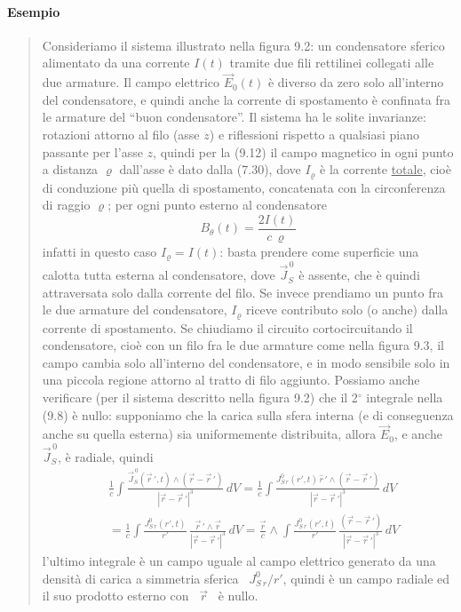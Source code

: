 \paragraph{Esempio}
\begin{quote}
  Consideriamo il sistema illustrato nella figura 9.2: un condensatore sferico
  alimentato da una corrente $I(t)$ tramite due fili rettilinei collegati alle
  due armature. Il campo elettrico $\vec E_0(t)$ \`e diverso da zero solo
  all'interno del condensatore, e quindi anche la corrente di spostamento \`e
  confinata fra le armature del ``buon condensatore''. Il sistema ha le solite
  invarianze: rotazioni attorno al filo (asse $z$) e riflessioni rispetto a
  qualsiasi piano passante per l'asse $z$, quindi per la (9.12) il campo
  magnetico in ogni punto a distanza $\varrho$ dall'asse
  \`e dato dalla (7.30), dove $I_\varrho$ \`e la corrente \underline{totale},
  cio\`e di conduzione pi\`u quella di spostamento, concatenata con la
  circonferenza di raggio $\varrho$; per ogni punto esterno al condensatore
  \begin{equation}
    B_\theta(t)=\frac{2I(t)}{c\,\varrho}
    \tag{9.13}
  \end{equation}
  infatti in questo caso $I_\varrho=I(t)$: basta prendere come superficie una
  calotta tutta esterna al condensatore, dove $\vec J_S^{\,0}$ \`e assente, che
  \`e quindi attraversata solo dalla corrente del filo. Se invece prendiamo un
  punto fra le due armature del condensatore, $I_\varrho$ riceve contributo solo
  (o anche) dalla corrente di spostamento.
  Se chiudiamo il circuito cortocircuitando il condensatore, cio\`e con un filo
  fra le due armature come nella figura 9.3, il campo cambia solo all'interno
  del condensatore, e in modo sensibile solo in una piccola regione attorno al
  tratto di filo aggiunto.
  Possiamo anche verificare (per il sistema descritto nella figura 9.2) che il
  2$^\circ$ integrale nella (9.8) \`e nullo: supponiamo che la carica sulla
  sfera interna (e di conseguenza anche su quella esterna) sia uniformemente
  distribuita, allora $\vec E_0$, e anche $\vec J_S^{\,0}$, \`e radiale, quindi
  \begin{equation}
    \begin{aligned}
      &\frac{1}{c}\int\frac{\vec J_S^{\,0}(\vec r\,',t)\wedge(\vec r-\vec r\,')}
      {|\vec r-\vec r\,'|^3}\,dV
      =\frac{1}{c}\int\frac{J_{S\,r}^0(r',t)\,\hat r\,'\wedge(\vec r-\vec r\,')}
      {|\vec r-\vec r\,'|^3}\,dV\\
      &=\frac{1}{c}\int\frac{J_{S\,r}^0(r',t)}{r'}\,
      \frac{\vec r\,'\wedge\vec r}{|\vec r-\vec r\,'|^3}\,dV
      =\frac{\vec r}{c}\wedge\int\frac{J_{S\,r}^0(r',t)}{r'}\,
      \frac{(\vec r-\vec r\,')}{|\vec r-\vec r\,'|^3}\,dV
    \end{aligned}
    \tag{9.14}
  \end{equation}
  l'ultimo integrale \`e un campo uguale al campo elettrico generato da una
  densit\`a di carica a simmetria sferica \ $J_{S\,r}^0/r'$, quindi \`e un campo
  radiale ed il suo prodotto esterno con \ $\vec r$ \ \`e nullo.
\end{quote}

